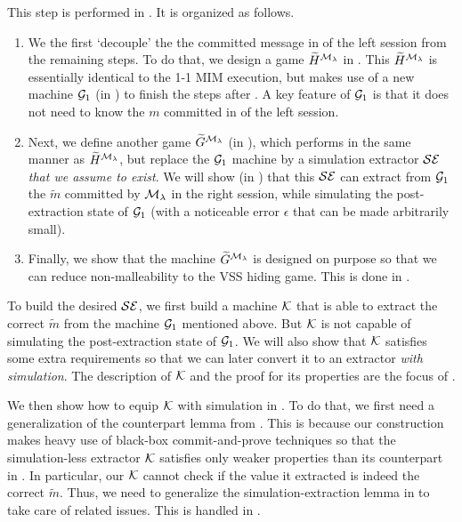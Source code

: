  This step is performed in . It is organized as follows.
\begin{enumerate}
\item
We the first `decouple’ the the committed message in  of the left session from the remaining steps. To do that, we design a game $\widetilde{H}^{\mathcal{M}_\lambda}$ in . This $\widetilde{H}^{\mathcal{M}_\lambda}$ is essentially identical to the 1-1 MIM execution, but makes use of a new machine $\mathcal{G}_1$ (in ) to finish the steps after . A key feature of $\mathcal{G}_1$ is that it does not need to know the $m$ committed in  of the left session.


\item
Next, we define another game $\widetilde{G}^{\mathcal{M}_\lambda}$ (in ), which performs  in the same manner as $\widetilde{H}^{\mathcal{M}_\lambda}$, but replace the $\mathcal{G}_1$ machine by a simulation extractor $\mathcal{SE}$ {\em that we assume to exist}. We will show (in ) that this $\mathcal{SE}$ can extract from $\mathcal{G}_1$ the $\tilde{m}$ committed by $\mathcal{M}_\lambda$ in the right session, while simulating the post-extraction state of $\mathcal{G}_1$ (with a noticeable error $\epsilon$ that can be made arbitrarily small).
\item
Finally, we show that the machine $\widetilde{G}^{\mathcal{M}_\lambda}$ is designed on purpose so that we can reduce non-malleability to the VSS hiding game. This is done in .
\end{enumerate}

 To build the desired $\mathcal{SE}$, we first build a machine $\mathcal{K}$ that is able to extract the correct $\tilde{m}$ from the machine $\mathcal{G}_1$ mentioned above. But $\mathcal{K}$ is not capable of simulating the post-extraction state of $\mathcal{G}_1$. We will also show that $\mathcal{K}$ satisfies some extra requirements so that we can later convert it to an extractor {\em with simulation}. The description of $\mathcal{K}$ and the proof for its properties are the focus of .

We then show how to equip $\mathcal{K}$ with simulation in . To do that, we first need a generalization of the counterpart lemma from \cite[Lemma 20]{arXiv:LPY23}. This is because our construction makes heavy use of black-box commit-and-prove techniques so that the simulation-less extractor $\mathcal{K}$ satisfies only weaker properties than its counterpart in \cite[Lemma 31]{arXiv:LPY23}. In particular, our $\mathcal{K}$ cannot check if the value it extracted is indeed the correct $\tilde{m}$. Thus, we need to generalize the simulation-extraction lemma in \cite[Lemma 20]{arXiv:LPY23} to take care of related issues. This is handled in .

